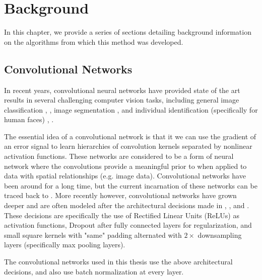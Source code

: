  
\chapter{Background} \label{sec:background}

In this chapter, we provide a series of sections detailing background information on the algorithms from which this method was developed.

\section{Convolutional Networks}

In recent years, convolutional neural networks have provided state of the art results in several challenging computer vision tasks, including general image classification \cite{krizhevsky2012imagenet}, \cite{szegedy2015going}, image segmentation \cite{long2015fully}, \cite{chen2014semantic} and individual identification (specifically for human faces) \cite{fan2014learning}, \cite{schroff2015facenet}.

The essential idea of a convolutional network is that it we can use the gradient of an error signal to learn hierarchies of convolution kernels separated by nonlinear activation functions.
These networks are considered to be a form of neural network where the convolutions provide a meaningful prior to when applied to data with spatial relationships (e.g. image data).
Convolutional networks have been around for a long time, but the current incarnation of these networks can be traced back to \cite{lecun1998gradient}.
More recently however, convolutional networks have grown deeper and are often modeled after the architectural decisions made in \cite{simonyan2014very}, \cite{sermanet2013overfeat}, and \cite{krizhevsky2012imagenet}.
These decisions are specifically the use of Rectified Linear Units (ReLUs) as activation functions, Dropout \cite{hinton2012improving} after fully connected layers for regularization, and small square kernels with "same" padding alternated with $2\times$ downsampling layers (specifically max pooling layers).

The convolutional networks used in this thesis use the above architectural decisions, and also use batch normalization \cite{ioffe2015batch} at every layer.

